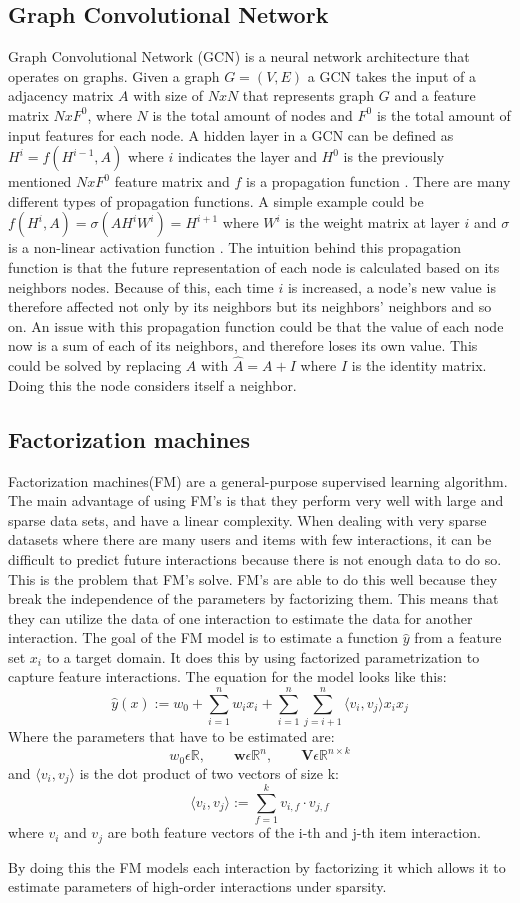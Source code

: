 \subsection{Graph Convolutional Network}
Graph Convolutional Network (GCN) is a neural network architecture that operates on graphs.
Given a graph $G = (V,E)$ a GCN takes the input of a adjacency
matrix $A$ with size of $N x N$ that represents graph $G$ and a feature matrix $N x F^0$, where $N$ is the total amount of nodes and $F^0$ is the total amount of input features for each node.
A hidden layer in a GCN can be defined as $H^i = f(H^{i-1}, A)$ where $i$ indicates the layer and $H^0$ is the previously mentioned $N x F^0$ feature matrix and $f$ is a propagation function \cite{Deep-Learning-on-Graphs-with-GCN}.
There are many different types of propagation functions.
A simple example could be $f(H^i, A) = \sigma(AH^iW^i) = H^{i+1}$ where $W^i$ is the weight matrix at layer $i$ and $\sigma$ is a non-linear activation function \cite{Deep-Learning-on-Graphs-with-GCN}.
The intuition behind this propagation function is that the future representation of each node is calculated based on its neighbors nodes.
Because of this, each time $i$ is increased, a node's new value is therefore affected not only by its neighbors but its neighbors' neighbors and so on.
An issue with this propagation function could be that the value of each node now is a sum of each of its neighbors, and therefore loses its own value.
This could be solved by replacing $A$ with $\hat{A} = A + I$ where $I$ is the identity matrix.
Doing this the node considers itself a neighbor.

\subsection{Factorization machines}
Factorization machines(FM) are a general-purpose supervised learning algorithm.
The main advantage of using FM's is that they perform very well with large and sparse data sets, and have a linear complexity.
When dealing with very sparse datasets where there are many users and items with few interactions, it can be difficult to predict future interactions because there is not enough data to do so.
This is the problem that FM's solve.
FM's are able to do this well because they break the independence of the parameters by factorizing them.
This means that they can utilize the data of one interaction to estimate the data for another interaction.
The goal of the FM model is to estimate a function $\hat{y}$ from a feature set $x_i$ to a target domain. 
It does this by using factorized parametrization to capture feature interactions.
The equation for the model looks like this:
\[ \hat{y}(x) := w_0 + \sum_{i=1}^{n} w_ix_i + \sum_{i=1}^{n}\sum_{j=i+1}^{n} \big \langle v_i,v_j \big \rangle x_ix_j \]
Where the parameters that have to be estimated are:
\[ w_0 \epsilon \mathbb{R}, \qquad \mathbf{w} \epsilon \mathbb{R}^n, \qquad  \mathbf{V}\epsilon \mathbb{R}^{n \times k} \]
and $\big \langle v_i,v_j \big \rangle$ is the dot product of two vectors of size k:
\[ \big \langle v_i,v_j \big \rangle := \sum_{f=1}^{k} v_{i,f} \cdot v_{j,f}\]
where $v_i$ and $v_j$ are both feature vectors of the i-th and j-th item interaction.

By doing this the FM models each interaction by factorizing it which allows it to estimate parameters of high-order interactions under sparsity.
